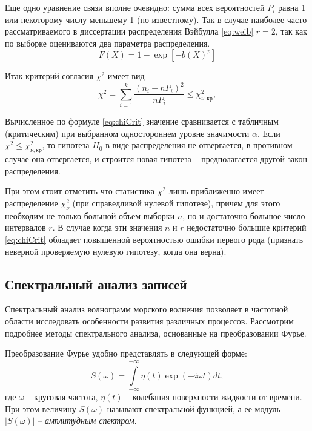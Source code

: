 Еще одно уравнение связи вполне очевидно: сумма всех вероятностей $P_i$ равна 1 или некоторому числу меньшему 1 (но известному). Так в случае наиболее часто рассматриваемого в диссертации распределения Вэйбулла \eqref{eq:weib} $r=2$, так как по выборке оцениваются два параметра распределения.
\begin{equation} \label{eq:weib}
F(X)=1-\exp \left[-b\left(X \right)^{p} \right]
\end{equation}

Итак критерий согласия $\chi^2$ имеет вид
\begin{equation}\label{eq:chiCrit}
  \chi^2=\sum\limits_{i=1}^k\frac{(n_i-nP_i)^2}{nP_i}\le\chi_{\nu,кр}^2,
\end{equation}

Вычисленное по формуле \eqref{eq:chiCrit} значение сравнивается с табличным (критическим) при выбранном одностороннем уровне значимости $\alpha$. Если $\chi^2\le\chi_{\nu,кр}^2$, то гипотеза $H_0$ в виде распределения не отвергается, в противном случае она отвергается, и строится новая гипотеза -- предполагается другой закон распределения.

При этом стоит отметить что статистика $\chi^2$ лишь приближенно имеет распределение $\chi^2_{\nu}$ (при справедливой нулевой гипотезе), причем для этого необходим не только большой объем выборки $n$, но и достаточно большое число интервалов $r$. В случае когда эти значения $n$ и $r$ недостаточно большие критерий \eqref{eq:chiCrit} обладает повышенной вероятностью ошибки первого рода  (признать неверной проверяемую нулевую гипотезу, когда она верна).

\subsection{ Спектральный анализ записей}

Спектральный анализ волнограмм морского волнения позволяет  в частотной области исследовать особенности развития различных процессов. Рассмотрим подробнее методы спектрального анализа, основанные на преобразовании Фурье.

Преобразование Фурье удобно представлять в следующей форме:
\begin{equation}\label{eq:fourier}
  S(\omega)=\int\limits^{+\infty}_{-\infty}\eta(t)\exp(-i\omega t)dt,
\end{equation}
\noindent
где $\omega$ -- круговая частота, $\eta(t)$ -- колебания поверхности жидкости от времени.  При этом величину $S(\omega)$ называют спектральной функцией, а ее модуль $|S(\omega)|$ -- \emph{амплитудным спектром}.

